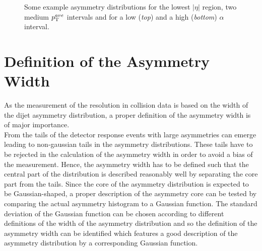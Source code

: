 \begin{figure}[!tp]
\begin{tabular}{cc}
  \end{tabular}
  \caption{Some example asymmetry distributions for the lowest $|\eta|$ region, two medium $p_{\text{T}}^{ave}$ intervals and for a low (\textit{top}) and a high (\textit{bottom}) $\alpha$ interval.}
  \label{fig:asymm_dists}
\end{figure}

\section{Definition of the Asymmetry Width}
\label{sec:jer_asymm_width_def}
As the measurement of the resolution in collision data is based on the width of the dijet asymmetry distribution, a proper definition of the asymmetry width is of major importance.\\
From the tails of the detector response events with large asymmetries can emerge leading to non-gaussian tails in the asymmetry distributions. These tails have to be rejected in the calculation of the asymmetry width in order to avoid a bias of the measurement. Hence, the asymmetry width has to be defined such that the central part of the distribution is described reasonably well by separating the core part from the tails. Since the core of the asymmetry distribution is expected to be Gaussian-shaped, a proper description of the asymmetry core can be tested by comparing the actual asymmetry histogram to a Gaussian function. The standard deviation of the Gaussian function can be chosen according to different definitions of the width of the asymmetry distribution and so the definition of the asymmetry width can be identified which features a good description of the asymmetry distribution by a corresponding Gaussian function. \\
